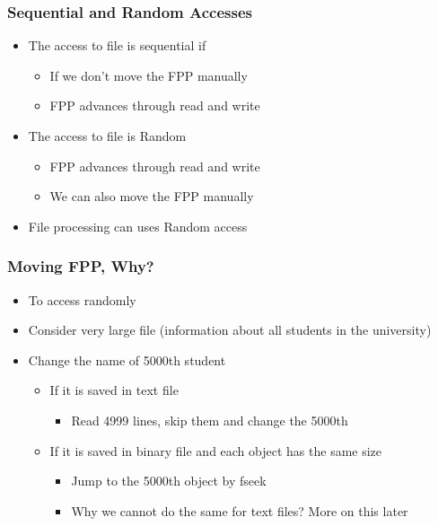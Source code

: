 \documentclass{../c-lecture}
\begin{document}
\begin{frame}
  \frametitle{Sequential and Random Accesses}
  \begin{itemize}
    \item The access to file is sequential if
    \begin{itemize}
      \item If we don't move the FPP manually
      \item FPP advances through read and write
    \end{itemize}
    \item The access to file is Random
    \begin{itemize}
      \item FPP advances through read and write
      \item We can also move the FPP manually
    \end{itemize}
    \item File processing can uses Random access
  \end{itemize}
\end{frame}

\begin{frame}
  \frametitle{Moving FPP, Why?}
  \begin{itemize}
    \item To access randomly
    \item
      Consider very large file (information about all students in the
      university)
    \item Change the name of 5000th student
    \begin{itemize}
      \item If it is saved in text file
      \begin{itemize}
        \item Read 4999 lines, skip them and change the 5000th
      \end{itemize}
      \item If it is saved in binary file and each object has the same size
      \begin{itemize}
        \item Jump to the 5000th object by fseek
        \item Why we cannot do the same for text files? More on this later
      \end{itemize}
    \end{itemize}
  \end{itemize}
\end{frame}
\end{document}
